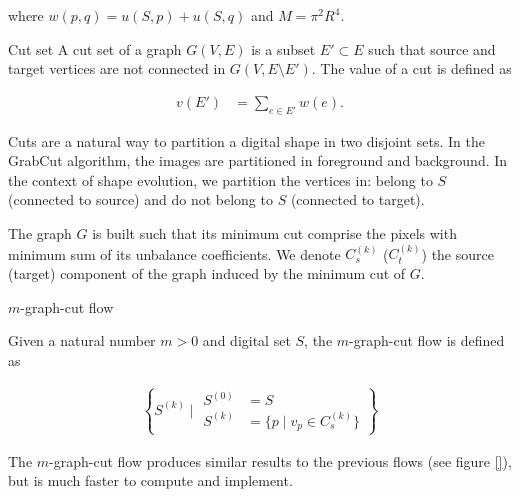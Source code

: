 where $w(p,q) = u(S,p) + u(S,q)$ and $M=\pi^2 R^4$. 

\begin{definition}{Cut set}
 A cut set of a graph $G(V,E)$ is a subset $E' \subset E$ such that source and target vertices are not connected in $G(V,E \setminus E')$. The value of a cut is defined as
 
 \begin{align*}
 	v(E') &= \sum_{e \in E'}{w(e)}.
 \end{align*}
 
\end{definition}

Cuts are a natural way to partition a digital shape in two disjoint sets. In the GrabCut algorithm, the images are partitioned in foreground and background. In the context of shape evolution, we partition the vertices in: belong to $S$ (connected to source) and do not belong to $S$ (connected to target).

The graph $G$ is built such that its minimum cut comprise the pixels with minimum sum of its unbalance coefficients. We denote $C_s^{(k)}$ ($C_t^{(k)}$) the source (target) component of the graph induced by the minimum cut of $G$. 

\begin{definition}{$m$-graph-cut flow}

Given a natural number $m>0$ and digital set $S$, the $m$-graph-cut flow is defined as

\begin{align*}
	\left \{ S^{(k)} \; | \; \begin{array}{ll}
	S^{(0)}&=S \\
	S^{(k)}&= \{ p \; | \; v_p \in C_s^{(k)} \}
	\end{array} \right\}
\end{align*}

\end{definition}

The $m$-graph-cut flow produces similar results to the previous flows (see figure \ref{}), but is much faster to compute and implement. 

